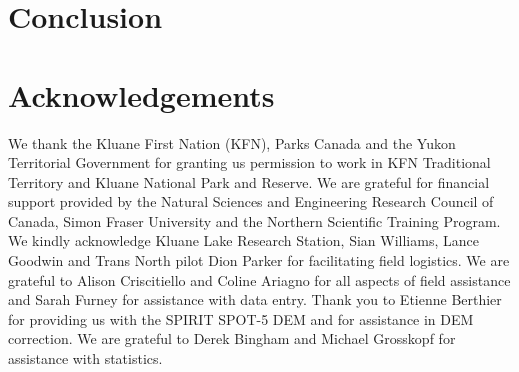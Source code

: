 \documentclass[twocolumn,letterpaper]{igs}
\begin{document}
\section{Conclusion}


\section{Acknowledgements}

We thank the Kluane First Nation (KFN), Parks Canada and the Yukon Territorial Government for granting us permission to work in KFN Traditional Territory and Kluane National Park and Reserve. We are grateful for financial support provided by the Natural Sciences and Engineering Research Council of  Canada, Simon Fraser University and the Northern Scientific Training Program. We kindly acknowledge Kluane Lake Research Station, Sian Williams, Lance Goodwin and Trans North pilot Dion Parker for facilitating field logistics. We are grateful to Alison Criscitiello and Coline Ariagno for all aspects of field assistance and Sarah Furney for assistance with data entry. Thank you to Etienne Berthier for providing us with the SPIRIT SPOT-5 DEM and for assistance in DEM correction. We are grateful to Derek Bingham and Michael Grosskopf for assistance with statistics. 



%
%

%


\end{document}
